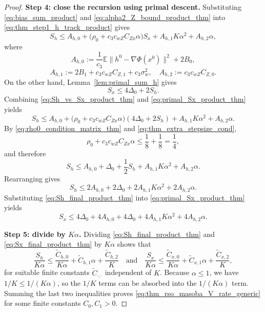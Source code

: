 \documentclass{pkumelon}
\theoremstyle{plain}
\newcommand{\E}{\mathbb{E}}
\newcommand{\Phiobj}{\Phi}
\begin{document}
\begin{proof}
\textbf{Step 4: close the recursion using primal descent. }
Substituting \eqref{eq:bias_sum_product} and \eqref{eq:alpha2_Z_bound_product_thm} into \eqref{eq:thm_step1_h_track_product} gives
\begin{equation}\label{eq:Sh_vs_Sx_product_thm}
S_h
\le
A_{h,0}
+\bigl(\rho_0+c_3c_{wZ}C_{Zx}\alpha\bigr)S_x+A_{h,1}K\alpha^2+A_{h,2}\alpha,
\end{equation}
where
\begin{equation*}
A_{h,0}:=\frac{1}{c_3}\E\|h^0-\nabla\Phiobj(x^0)\|^2+2B_0,
\end{equation*}
\begin{equation*}
A_{h,1}:=2B_1+c_3c_{wZ}C_{Z,1}+c_3\sigma_w^2, \quad A_{h,2}:=c_3c_{wZ}C_{Z,0}.
\end{equation*}
On the other hand, Lemma~\ref{lem:primal_sum_h} gives
\begin{equation}\label{eq:primal_Sx_product_thm}
S_x\le 4\Delta_0+2S_h.
\end{equation}
Combining \eqref{eq:Sh_vs_Sx_product_thm} and \eqref{eq:primal_Sx_product_thm} yields
\begin{equation*}
S_h \le A_{h,0} +\bigl(\rho_0+c_3c_{wZ}C_{Zx}\alpha\bigr)(4\Delta_0+2S_h) +A_{h,1}K\alpha^2+A_{h,2}\alpha.
\end{equation*}
By \eqref{eq:rho0_condition_matrix_thm} and \eqref{eq:thm_extra_stepsize_cond},
\begin{equation*}
\rho_0+c_3c_{wZ}C_{Zx}\alpha\le \frac18+\frac18=\frac14,
\end{equation*}
and therefore
\begin{equation*}
S_h \le A_{h,0}+\Delta_0+\frac12 S_h+A_{h,1}K\alpha^2+A_{h,2}\alpha.
\end{equation*}
Rearranging gives
\begin{equation}\label{eq:Sh_final_product_thm}
S_h
\le
2A_{h,0}+2\Delta_0+2A_{h,1}K\alpha^2+2A_{h,2}\alpha.
\end{equation}
Substituting \eqref{eq:Sh_final_product_thm} into \eqref{eq:primal_Sx_product_thm} yields
\begin{equation}\label{eq:Sx_final_product_thm}
S_x
\le
4\Delta_0+4A_{h,0}+4\Delta_0+4A_{h,1}K\alpha^2+4A_{h,2}\alpha.
\end{equation}

\textbf{Step 5: divide by $K\alpha$. }
Dividing \eqref{eq:Sh_final_product_thm} and \eqref{eq:Sx_final_product_thm} by $K\alpha$ shows that
\begin{equation*}
\frac{S_h}{K\alpha} \le \frac{\widetilde C_{h,0}}{K\alpha} +\widetilde C_{h,1}\alpha +\frac{\widetilde C_{h,2}}{K} \quad \text{and} \quad \frac{S_x}{K\alpha} \le \frac{\widetilde C_{x,0}}{K\alpha} +\widetilde C_{x,1}\alpha +\frac{\widetilde C_{x,2}}{K},
\end{equation*}
for suitable finite constants $\widetilde C_{\cdot,\cdot}$ independent of $K$. Because $\alpha\le 1$, we have $1/K\le 1/(K\alpha)$, so the $1/K$ terms can be absorbed into the $1/(K\alpha)$ term. Summing the last two inequalities proves \eqref{eq:thm_rso_masoba_V_rate_generic} for some finite constants $C_0,C_1>0$.


\end{proof}
\end{document}
